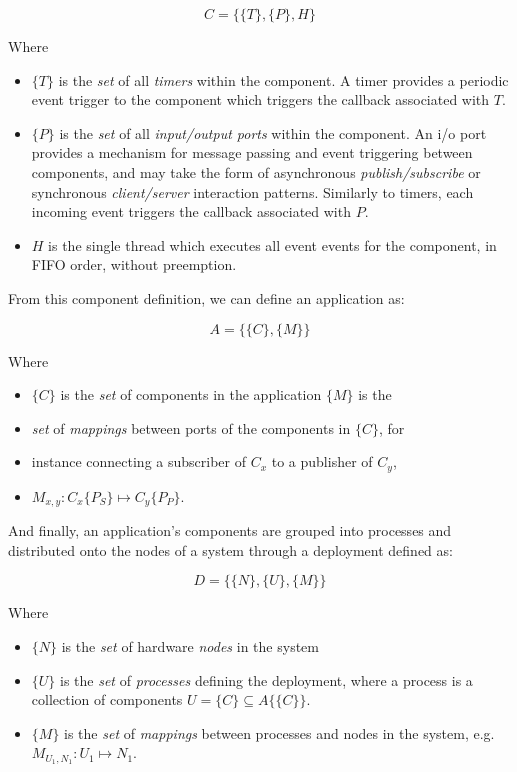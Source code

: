 \begin{equation}
  C = \{\{T\},\{P\},H\}
\end{equation}

Where

\begin{itemize}
\item $\{T\}$ is the \emph{set} of all \emph{timers} within the component.  A
  timer provides a periodic event trigger to the component which
  triggers the callback associated with $T$.
\item $\{P\}$ is the \emph{set} of all \emph{input/output ports} within the
  component.  An i/o port provides a mechanism for message passing and
  event triggering between components, and may take the form of
  asynchronous \emph{publish/subscribe} or synchronous \emph{client/server}
  interaction patterns.  Similarly to timers, each incoming event
  triggers the callback associated with $P$.
\item $H$ is the single thread which executes all event events for
  the component, in FIFO order, without preemption.  
\end{itemize}

From this component definition, we can define an application as:

\begin{equation}
  A = \{\{C\},\{M\}\}
\end{equation}

Where

\begin{itemize}
\item $\{C\}$ is the \emph{set} of components in the application $\{M\}$ is the
\item \emph{set} of \emph{mappings} between ports of the components in $\{C\}$, for
\item instance connecting a subscriber of $C_x$ to a publisher of $C_y$,
\item $M_{x,y} : C_x\{P_S\}\mapsto C_y\{P_P\}$.
\end{itemize}

And finally, an application's components are grouped into processes
and distributed onto the nodes of a system through a deployment
defined as:

\begin{equation}
  D = \{\{N\},\{U\},\{M\}\}
\end{equation}

Where

\begin{itemize}
\item $\{N\}$ is the \emph{set} of hardware \emph{nodes} in the system
\item $\{U\}$ is the \emph{set} of \emph{processes} defining the deployment,
  where a process is a collection of components
  $U=\{C\}\subseteq A\{\{C\}\}$.
\item $\{M\}$ is the \emph{set} of \emph{mappings} between processes and nodes
  in the system, e.g. $M_{U_1,N_1} : U_1\mapsto N_1$.
\end{itemize}

